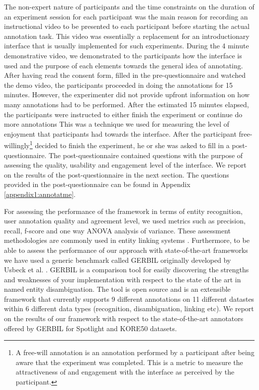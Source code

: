 The non-expert nature of participants and the time constraints on the duration of an experiment session for each participant was the main reason for recording an instructional video to be presented to each participant before starting the actual annotation task. This video was essentially a replacement for an introductionary interface that is usually implemented for such experiments. During the 4 minute demonstrative video, we demonstrated to the participants how the interface is used and the purpose of each elements towards the general idea of annotating. After having read the consent form, filled in the pre-questionnaire and watched the demo video, the participants proceeded in doing the annotations for 15 minutes. However, the experimenter did not provide upfront information on how many annotations had to be performed. After the estimated 15 minutes elapsed, the participants were instructed to either finish the experiment or continue do more annotations This was a technique we used for measuring the level of enjoyment that participants had towards the interface. After the participant free-willingly\footnote{A free-will annotation is an annotation performed by a participant after being aware that the experiment was completed. This is a metric to measure the attractiveness of and engagement with the interface as perceived by the participant.} decided to finish the experiment, he or she was asked to fill in a post-questionnaire. The post-questionnaire contained questions with the purpose of assessing the quality, usability and engagement level of the interface. We report on the results of the post-questionnaire in the next section. The questions provided in the post-questionnaire can be found in Appendix \ref{appendix1:annotatme}.

For assessing the performance of the framework in terms of entity recognition, user annotation quality and agreement level, we used metrics such as precision, recall, f-score and one way ANOVA analysis of variance. These assessment methodologies are commonly used in entity linking systems \cite{12}. Furthermore, to be able to assess the performance of our approach with state-of-the-art frameworks we have used a generic benchmark called GERBIL  originally developed by Usbeck et al. \cite{40}. GERBIL is a comparison tool for easily discovering the strengths and weaknesses of your implementation with respect to the state of the art in named entity disambiguation. The tool is open source and is an extensible framework that currently supports 9 different annotations on 11 different datastes within 6 different data types (recognition, disambiguation, linking etc). We report on the results of our framework with respect to the state-of-the-art annotators offered by GERBIL for Spotlight and KORE50 datasets. 


